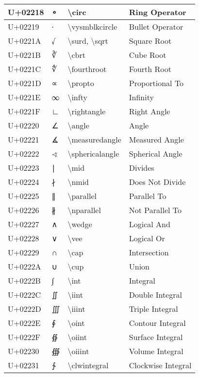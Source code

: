 \begin{table}[h]
\begin{tabulary}{\linewidth}{|L|L|L|L|}
\hline
U+02218 & ∘ & {\textbackslash}circ & Ring Operator \\
\hline
U+02219 & ∙ & {\textbackslash}vysmblkcircle & Bullet Operator \\
\hline
U+0221A & √ & {\textbackslash}surd, {\textbackslash}sqrt & Square Root \\
\hline
U+0221B & ∛ & {\textbackslash}cbrt & Cube Root \\
\hline
U+0221C & ∜ & {\textbackslash}fourthroot & Fourth Root \\
\hline
U+0221D & ∝ & {\textbackslash}propto & Proportional To \\
\hline
U+0221E & ∞ & {\textbackslash}infty & Infinity \\
\hline
U+0221F & ∟ & {\textbackslash}rightangle & Right Angle \\
\hline
U+02220 & ∠ & {\textbackslash}angle & Angle \\
\hline
U+02221 & ∡ & {\textbackslash}measuredangle & Measured Angle \\
\hline
U+02222 & ∢ & {\textbackslash}sphericalangle & Spherical Angle \\
\hline
U+02223 & ∣ & {\textbackslash}mid & Divides \\
\hline
U+02224 & ∤ & {\textbackslash}nmid & Does Not Divide \\
\hline
U+02225 & ∥ & {\textbackslash}parallel & Parallel To \\
\hline
U+02226 & ∦ & {\textbackslash}nparallel & Not Parallel To \\
\hline
U+02227 & ∧ & {\textbackslash}wedge & Logical And \\
\hline
U+02228 & ∨ & {\textbackslash}vee & Logical Or \\
\hline
U+02229 & ∩ & {\textbackslash}cap & Intersection \\
\hline
U+0222A & ∪ & {\textbackslash}cup & Union \\
\hline
U+0222B & ∫ & {\textbackslash}int & Integral \\
\hline
U+0222C & ∬ & {\textbackslash}iint & Double Integral \\
\hline
U+0222D & ∭ & {\textbackslash}iiint & Triple Integral \\
\hline
U+0222E & ∮ & {\textbackslash}oint & Contour Integral \\
\hline
U+0222F & ∯ & {\textbackslash}oiint & Surface Integral \\
\hline
U+02230 & ∰ & {\textbackslash}oiiint & Volume Integral \\
\hline
U+02231 & ∱ & {\textbackslash}clwintegral & Clockwise Integral \\

\end{tabulary}
\end{table}
